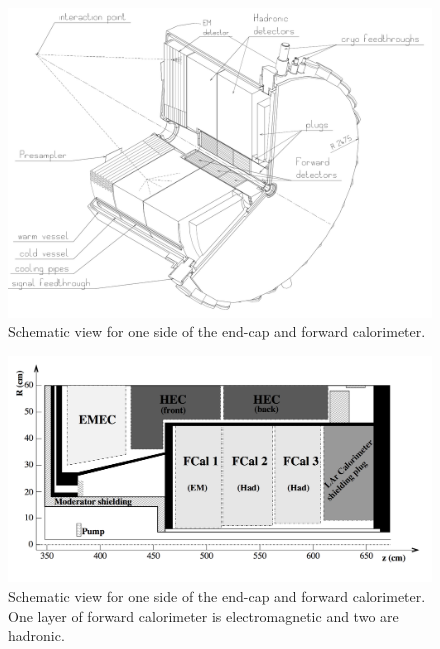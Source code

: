\begin{figure}
\centering
\includegraphics[width=\textwidth]{data/photo/detector/endcap1.png}
\caption{Schematic view for one side of the end-cap and forward calorimeter. \cite{calorimeter}}
\label{fig:calorimeter_endcap1}
\end{figure}

\begin{figure}
\centering
\includegraphics[width=\textwidth]{data/photo/detector/endcap2.png}
\caption{Schematic view for one side of the end-cap and forward calorimeter. One layer of forward calorimeter is electromagnetic and two are hadronic. \cite{ATLAS_doc}}
\label{fig:calorimeter_endcap2}
\end{figure}

